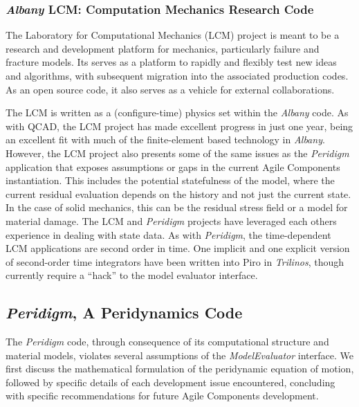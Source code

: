 \documentclass[10pt]{article}
\theoremstyle{plain}
\theoremstyle{definition}
\theoremstyle{remark}
\numberwithin{equation}{section}
\begin{document}
\subsubsection{\emph{Albany} LCM: Computation Mechanics Research Code} \label{sec:albany:lcm}

The Laboratory for Computational Mechanics (LCM) project \cite{LCMWebPage:2011} is meant to be a research and development platform for mechanics, particularly failure and fracture models. Its serves as a platform to rapidly and flexibly test new ideas and algorithms, with subsequent migration into the associated production codes. As an open source code, it also serves as a vehicle for external collaborations.

The LCM is written as a (configure-time) physics set within the \emph{Albany} code. As with QCAD, the LCM project has made excellent progress in just one year, being an excellent fit with much of the finite-element based technology in \emph{Albany}. However, the LCM project also presents some of the same issues as the \emph{Peridigm} application that exposes assumptions or gaps in the current Agile Components instantiation. This includes the potential statefulness of the model, where the current residual evaluation depends on the history and not just the current state. In the case of solid mechanics, this can be the residual stress field or a model for material damage. The LCM and \emph{Peridigm} projects have leveraged each others experience in dealing with state data. As with \emph{Peridigm}, the time-dependent LCM applications are second order in time. One implicit and one explicit version of second-order time integrators have been written into Piro in \emph{Trilinos}, though currently require a ``hack'' to the model evaluator interface.

\subsection{\emph{Peridigm}, A Peridynamics Code} \label{sec:peridigm}

The \emph{Peridigm} code, through consequence of its computational structure and material models, violates several assumptions of the \emph{ModelEvaluator} interface. We first discuss the mathematical formulation of the peridynamic equation of motion, followed by specific details of each development issue encountered, concluding with specific recommendations for future Agile Components development.
\end{document}
